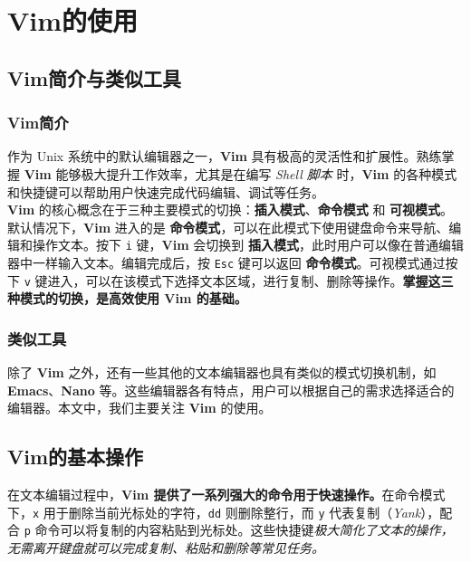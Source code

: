 \chapter{Vim的使用}
\label{cp:vim}

\section{Vim简介与类似工具}

\subsection{Vim简介}

作为 Unix 系统中的默认编辑器之一，\textbf{Vim} 具有极高的灵活性和扩展性。熟练掌握 \textbf{Vim} 能够极大提升工作效率，尤其是在编写 \textit{Shell 脚本} 时，\textbf{Vim} 的各种模式和快捷键可以帮助用户快速完成代码编辑、调试等任务。\\

\textbf{Vim} 的核心概念在于三种主要模式的切换：\textbf{插入模式}、\textbf{命令模式} 和 \textbf{可视模式}。默认情况下，\textbf{Vim} 进入的是 \textbf{命令模式}，可以在此模式下使用键盘命令来导航、编辑和操作文本。按下 \texttt{i} 键，\textbf{Vim} 会切换到 \textbf{插入模式}，此时用户可以像在普通编辑器中一样输入文本。编辑完成后，按 \texttt{Esc} 键可以返回 \textbf{命令模式}。可视模式通过按下 \texttt{v} 键进入，可以在该模式下选择文本区域，进行复制、删除等操作。\textbf{掌握这三种模式的切换，是高效使用 Vim 的基础。}

\subsection{类似工具}

除了 \textbf{Vim} 之外，还有一些其他的文本编辑器也具有类似的模式切换机制，如 \textbf{Emacs}、\textbf{Nano} 等。这些编辑器各有特点，用户可以根据自己的需求选择适合的编辑器。本文中，我们主要关注 \textbf{Vim} 的使用。

\section{Vim的基本操作}

在文本编辑过程中，\textbf{Vim 提供了一系列强大的命令用于快速操作。}在命令模式下，\texttt{x} 用于删除当前光标处的字符，\texttt{dd} 则删除整行，而 \texttt{y} 代表复制（\textit{Yank}），配合 \texttt{p} 命令可以将复制的内容粘贴到光标处。这些快捷键\textit{极大简化了文本的操作，无需离开键盘就可以完成复制、粘贴和删除等常见任务。}\\

